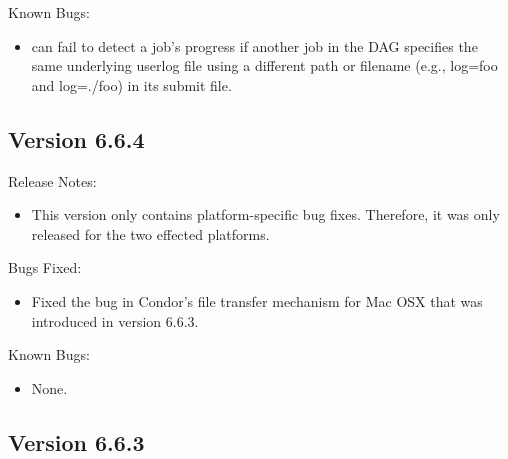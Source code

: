 \noindent Known Bugs:

\begin{itemize}

\item {} can fail to detect a job's progress if another
      job in the DAG specifies the same underlying userlog file using
      a different path or filename (e.g., log=foo and log=./foo) in
      its submit file.

\end{itemize}



\subsection{\label{sec:New-6-6-4}Version 6.6.4}

\noindent Release Notes:

\begin{itemize}

\item This version only contains platform-specific bug fixes.
  Therefore, it was only released for the two effected platforms. 

\end{itemize}

\noindent Bugs Fixed:

\begin{itemize}

\item Fixed the bug in Condor's file transfer mechanism for Mac OSX
  that was introduced in version 6.6.3.

\end{itemize}

\noindent Known Bugs:

\begin{itemize}

\item None.

\end{itemize}



\subsection{\label{sec:New-6-6-3}Version 6.6.3}

